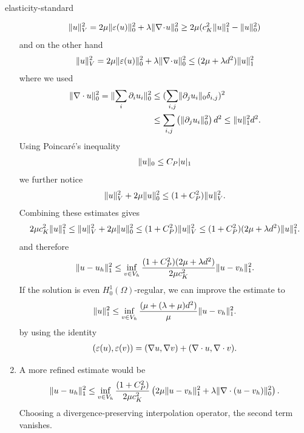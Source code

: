 \begin{Problem}{elasticity-standard}
\begin{solution}
\begin{enumerate}
   \begin{align}
    \lVert u\rVert_V^2=2\mu\lVert\varepsilon(u)\rVert_0^2+ \lambda \lVert\nabla\!\cdot\! u\rVert_0^2\geq
    2\mu(c_K^2\lVert u\rVert_1^2-\lVert u\rVert_0^2)
   \end{align}
   and on the other hand
   \begin{align}
    \lVert u\rVert_V^2=2\mu\lVert\varepsilon(u)\rVert_0^2+ \lambda \lVert\nabla\!\cdot\! u\rVert_0^2\leq
    (2\mu+\lambda d^2)\lVert u\rVert_1^2
   \end{align}
   where we used
   \begin{align}
    \lVert\nabla \cdot u\rVert_0^2 = \lVert\sum_i \partial_i u_i\rVert_0^2 &\leq (\sum_{i,j} \lVert\partial_j u_i\rVert_0\delta_{i,j})^2\\
    & \leq \sum_{i,j} \left(\lVert\partial_j u_i\rVert_0^2\right) d^2 \leq \lVert u\rVert_1^2 d^2.
   \end{align}
   Using Poincaré's inequality
   \begin{align}
    \lVert u\rVert_0\leq C_P |u|_1
   \end{align}
   we further notice
   \begin{align}
    \lVert u\rVert_V^2+2\mu\lVert u\rVert_0^2\leq (1+C_P^2) \lVert u\rVert_V^2.
   \end{align}
   Combining these estimates gives
   \begin{align}
   2\mu c_K^2\lVert u\rVert_1^2\leq
    \lVert u\rVert_V^2+2\mu \lVert u\rVert_0^2\leq
    (1+C_P^2)\lVert u\rVert_V^2\leq
    (1+C_P^2)(2\mu+\lambda d^2)\lVert u\rVert_1^2.
   \end{align}
   and therefore
   \begin{align}
    \lVert u-u_h\rVert_1^2\leq \inf_{v\in V_h} \frac{(1+C_P^2)(2\mu+\lambda d^2)}{2\mu c_K^2}\lVert u-v_h\rVert_1^2.
   \end{align}
   If the solution is even $H_0^1(\Omega)$-regular, we can improve the estimate to
   \begin{align}
    \lVert u\rVert_1^2\leq \inf_{v\in V_h}\frac{(\mu+(\lambda+\mu) d^2)}{\mu}\lVert u-v_h\rVert_1^2.
   \end{align}
   by using the identity
   \begin{align}
    (\varepsilon(u), \varepsilon(v)) = (\nabla u, \nabla v) + (\nabla \cdot u, \nabla \cdot v).
   \end{align}

   \item A more refined estimate would be
   \begin{align}
    \lVert u-u_h\rVert_1^2\leq \inf_{v\in V_h}\frac{(1+C_P^2)}{2\mu c_K^2}\left(2\mu\lVert u-v_h\rVert_1^2+\lambda \lVert\nabla\cdot (u-v_h)\rVert_0^2\right).
   \end{align}
   Choosing a divergence-preserving interpolation operator, the second term vanishes.
  \end{enumerate}
\end{solution}
\end{Problem}

